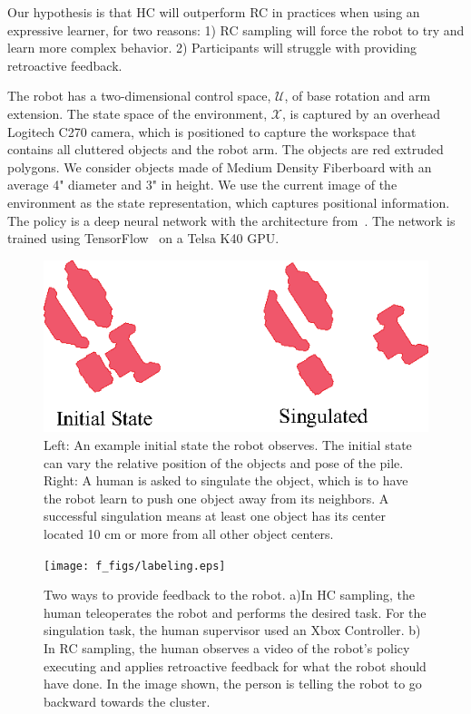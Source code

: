 \documentclass[10pt, conference]{ieeeconf}      %
\begin{document}
Our hypothesis is that HC will outperform RC in practices when using an expressive learner, for two reasons: 1) RC sampling will force the robot to try and learn more complex behavior. 2) Participants will struggle with providing retroactive feedback. 

The robot has a two-dimensional control space, $\mathcal{U}$, of base rotation and arm extension. The state space of the environment, $\mathcal{X}$, is captured by an overhead Logitech C270 camera, which is positioned to capture the workspace that contains all cluttered objects and the robot arm.  The objects are red extruded polygons. We consider objects made of Medium Density Fiberboard with an average 4" diameter and 3" in height.  We use the current image of the environment as the state representation, which captures positional information. The policy is a deep neural network with the architecture from~\cite{laskeyrobot}. The network is trained using TensorFlow~\cite{tensorflow2015-whitepaper} on a Telsa K40 GPU. 

\begin{figure}
\centering
\includegraphics{f_figs/singulation.eps}
\caption{
    \footnotesize
Left: An example initial state the robot observes. The initial state can vary the relative position of the objects and pose of the pile. Right: A human is asked to singulate the object, which is to have the robot learn to push one object away from its neighbors. A successful singulation means at least one object has its center located 10 cm or more from all other object centers.   }

\label{fig:izzy_sing}
\end{figure}


\begin{figure}
\centering
\texttt{[image: f\_figs/labeling.eps]}
\caption{
    \footnotesize
Two ways to provide feedback to the robot. a)In HC sampling, the human teleoperates the robot and performs the desired task. For the singulation task, the human supervisor used an Xbox Controller. b) In RC sampling, the human observes a video of the robot's policy executing and applies retroactive feedback for what the robot should have done. In the image shown, the person is telling the robot to go backward towards the cluster.  }

\label{fig:labeling}
\end{figure}
\end{document}
